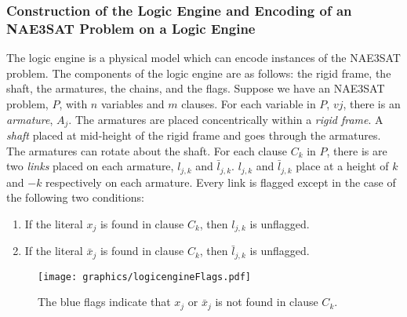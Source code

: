 \subsubsection{Construction of the Logic Engine and Encoding of an NAE3SAT Problem on a Logic 
Engine}
The logic engine is a physical model which can encode instances of the NAE3SAT problem.  The 
components of the logic engine are as follows: the rigid frame, the shaft, the armatures,
the chains, and the flags.  Suppose we have an NAE3SAT problem, $P$, with $n$ variables and $m$ 
clauses.  For each variable in $P$, $vj$, there is an \textit{armature}, $A_j$.  The armatures are 
placed concentrically within a \textit{rigid frame}.  A \textit{shaft} placed at mid-height of the 
rigid frame and goes through the armatures.  The armatures can rotate about the shaft.  For each 
clause $C_k$ in $P$, there is are two \textit{links} placed on each armature, $l_{j,k}$ and 
$\bar{l}_{j,k}$. $l_{j,k}$ and $\bar{l}_{j,k}$ place at a height of $k$ and $-k$ respectively on  
each armature.  Every link is flagged except in the case of the following two conditions:
\begin{enumerate}
 \item If the literal $x_j$ is found in clause $C_k$, then $l_{j,k}$ is unflagged.
 \item If the literal $\bar{x}_j$ is found in clause $C_k$, then $\bar{l}_{j,k}$ is unflagged.
\end{enumerate}
\begin{figure}[!htbp]
\begin{center}
\texttt{[image: graphics/logicengineFlags.pdf]}
\caption{The blue flags indicate that $x_j$ or $\bar{x}_j$ is not found in clause $C_k$. 
}\label{fig:logicengine-1}
\end{center}
\end{figure}
% 
% 
